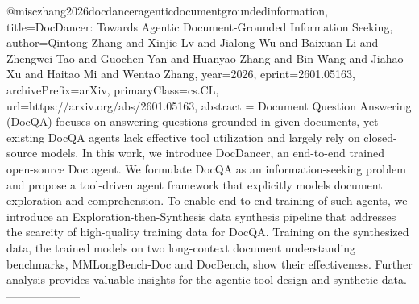 {}@misc{zhang2026docdanceragenticdocumentgroundedinformation,
      title={DocDancer: Towards Agentic Document-Grounded Information Seeking}, 
      author={Qintong Zhang and Xinjie Lv and Jialong Wu and Baixuan Li and Zhengwei Tao and Guochen Yan and Huanyao Zhang and Bin Wang and Jiahao Xu and Haitao Mi and Wentao Zhang},
      year={2026},
      eprint={2601.05163},
      archivePrefix={arXiv},
      primaryClass={cs.CL},
      url={https://arxiv.org/abs/2601.05163},
      abstract = {Document Question Answering (DocQA) focuses on answering questions grounded in given documents, yet existing DocQA agents lack effective tool utilization and largely rely on closed-source models. In this work, we introduce DocDancer, an end-to-end trained open-source Doc agent. We formulate DocQA as an information-seeking problem and propose a tool-driven agent framework that explicitly models document exploration and comprehension. To enable end-to-end training of such agents, we introduce an Exploration-then-Synthesis data synthesis pipeline that addresses the scarcity of high-quality training data for DocQA. Training on the synthesized data, the trained models on two long-context document understanding benchmarks, MMLongBench-Doc and DocBench, show their effectiveness. Further analysis provides valuable insights for the agentic tool design and synthetic data.}
}
        --------------------
        